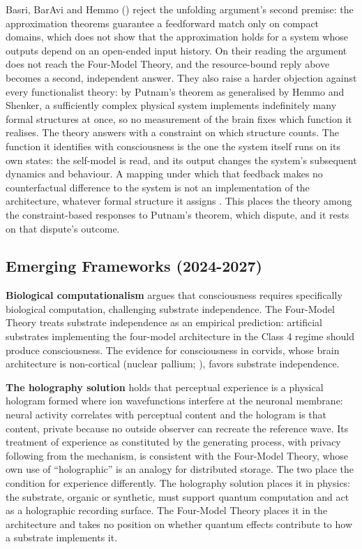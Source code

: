 \documentclass[12pt]{article}
\begin{document}
Basri, BarAvi and Hemmo (\citeyear{Basri2026}) reject the unfolding argument's second premise: the approximation theorems guarantee a feedforward match only on compact domains, which does not show that the approximation holds for a system whose outputs depend on an open-ended input history. On their reading the argument does not reach the Four-Model Theory, and the resource-bound reply above becomes a second, independent answer. They also raise a harder objection against every functionalist theory: by Putnam's theorem as generalised by Hemmo and Shenker, a sufficiently complex physical system implements indefinitely many formal structures at once, so no measurement of the brain fixes which function it realises. The theory answers with a constraint on which structure counts. The function it identifies with consciousness is the one the system itself runs on its own states: the self-model is read, and its output changes the system's subsequent dynamics and behaviour. A mapping under which that feedback makes no counterfactual difference to the system is not an implementation of the architecture, whatever formal structure it assigns \citep{Chalmers1996b}. This places the theory among the constraint-based responses to Putnam's theorem, which \citeauthor{Basri2026} dispute, and it rests on that dispute's outcome.


\subsection{Emerging Frameworks (2024-2027)}


\textbf{Biological computationalism} \citep{Milinkovic2025} argues that consciousness requires specifically biological computation, challenging substrate independence. The Four-Model Theory treats substrate independence as an empirical prediction: artificial substrates implementing the four-model architecture in the Class 4 regime should produce consciousness. The evidence for consciousness in corvids, whose brain architecture is non-cortical (nuclear pallium; \citealp{Gunturkun2016}), favors substrate independence.

\textbf{The holography solution} \citep{KirkebyHinrupStoll2026} holds that perceptual experience is a physical hologram formed where ion wavefunctions interfere at the neuronal membrane: neural activity correlates with perceptual content and the hologram is that content, private because no outside observer can recreate the reference wave. Its treatment of experience as constituted by the generating process, with privacy following from the mechanism, is consistent with the Four-Model Theory, whose own use of ``holographic'' is an analogy for distributed storage. The two place the condition for experience differently. The holography solution places it in physics: the substrate, organic or synthetic, must support quantum computation and act as a holographic recording surface. The Four-Model Theory places it in the architecture and takes no position on whether quantum effects contribute to how a substrate implements it.
\end{document}
